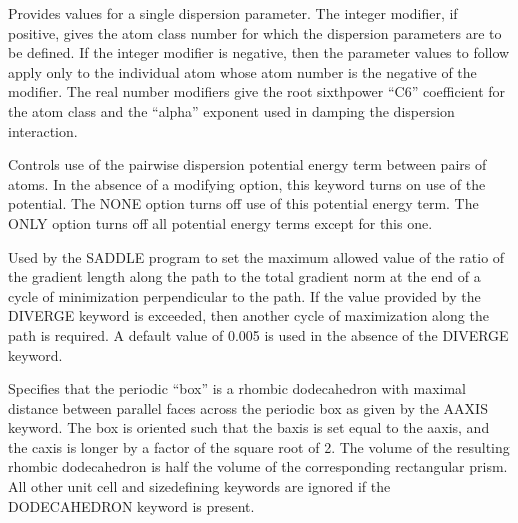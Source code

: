 \documentclass[letterpaper,11pt,english]{sphinxmanual}
\begin{document}
\ignorespaces {}\label{\detokenize{text/keywords:key-dispersion}}\begin{description}
\sphinxAtStartPar
Provides values for a single dispersion parameter. The integer modifier, if positive, gives the atom class number for which the dispersion parameters are to be defined. If the integer modifier is negative, then the parameter values to follow apply only to the individual atom whose atom number is the negative of the modifier. The real number modifiers give the root sixth\sphinxhyphen{}power “C6” coefficient for the atom class and the “alpha” exponent used in damping the dispersion interaction.

\end{description}

\ignorespaces {}\label{\detokenize{text/keywords:key-dispersionterm}}\begin{description}
\sphinxAtStartPar
Controls use of the pairwise dispersion potential energy term between pairs of atoms. In the absence of a modifying option, this keyword turns on use of the potential. The NONE option turns off use of this potential energy term. The ONLY option turns off all potential energy terms except for this one.

\end{description}

\ignorespaces {}\label{\detokenize{text/keywords:key-diverge}}\begin{description}
\sphinxAtStartPar
Used by the SADDLE program to set the maximum allowed value of the ratio of the gradient length along the path to the total gradient norm at the end of a cycle of minimization perpendicular to the path. If the value provided by the DIVERGE keyword is exceeded, then another cycle of maximization along the path is required. A default value of 0.005 is used in the absence of the DIVERGE keyword.

\end{description}

\ignorespaces {}\label{\detokenize{text/keywords:key-dodecahedron}}\begin{description}
\sphinxAtStartPar
Specifies that the periodic “box” is a rhombic dodecahedron with maximal distance between parallel faces across the periodic box as given by the A\sphinxhyphen{}AXIS keyword. The box is oriented such that the b\sphinxhyphen{}axis is set equal to the a\sphinxhyphen{}axis, and the c\sphinxhyphen{}axis is longer by a factor of the square root of 2. The volume of the resulting rhombic dodecahedron is half the volume of the corresponding rectangular prism. All other unit cell and size\sphinxhyphen{}defining keywords are ignored if the DODECAHEDRON keyword is present.

\end{description}
\end{document}
